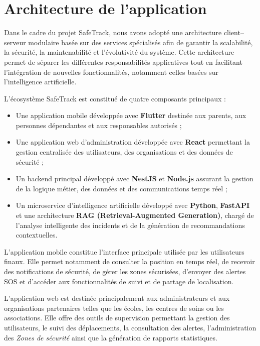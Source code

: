 \section{Architecture de l'application}

Dans le cadre du projet SafeTrack, nous avons adopté une architecture client--serveur modulaire basée sur des services spécialisés afin de garantir la scalabilité, la sécurité, la maintenabilité et l'évolutivité du système. Cette architecture permet de séparer les différentes responsabilités applicatives tout en facilitant l'intégration de nouvelles fonctionnalités, notamment celles basées sur l'intelligence artificielle.

L'écosystème SafeTrack est constitué de quatre composants principaux :

\begin{itemize}
    \item Une application mobile développée avec \textbf{Flutter} destinée aux parents, aux personnes dépendantes et aux responsables autorisés ;
    
    \item Une application web d'administration développée avec \textbf{React} permettant la gestion centralisée des utilisateurs, des organisations et des données de sécurité ;
    
    \item Un backend principal développé avec \textbf{NestJS} et \textbf{Node.js} assurant la gestion de la logique métier, des données et des communications temps réel ;
    
    \item Un microservice d'intelligence artificielle développé avec \textbf{Python}, \textbf{FastAPI} et une architecture \textbf{RAG (Retrieval-Augmented Generation)}, chargé de l'analyse intelligente des incidents et de la génération de recommandations contextuelles.
\end{itemize}

L'application mobile constitue l'interface principale utilisée par les utilisateurs finaux. Elle permet notamment de consulter la position en temps réel, de recevoir des notifications de sécurité, de gérer les zones sécurisées, d'envoyer des alertes SOS et d'accéder aux fonctionnalités de suivi et de partage de localisation.

L'application web est destinée principalement aux administrateurs et aux organisations partenaires telles que les écoles, les centres de soins ou les associations. Elle offre des outils de supervision permettant la gestion des utilisateurs, le suivi des déplacements, la consultation des alertes, l'administration des \textit{Zones de sécurité} ainsi que la génération de rapports statistiques.

